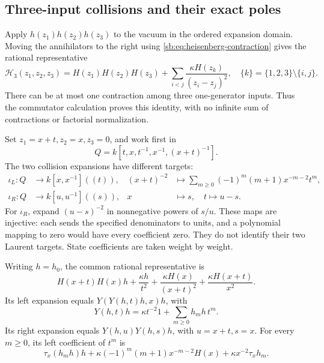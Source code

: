 \subsection{Three-input collisions and their exact poles}

Apply \(h(z_1)h(z_2)h(z_3)\) to the vacuum in the ordered
expansion domain.  Moving the annihilators to the right using
\eqref{sb:eq:heisenberg-contraction} gives the rational representative
\[
 \mathcal H_3(z_1,z_2,z_3)
 =H(z_1)H(z_2)H(z_3)
  +\sum_{i<j}\frac{\kappa H(z_k)}{(z_i-z_j)^2},
 \quad \{k\}=\{1,2,3\}\setminus\{i,j\}.
\]
There can be at most one contraction among three one-generator inputs.
Thus the commutator calculation proves this identity, with no infinite
sum of contractions or factorial normalization.

Set \(z_1=x+t,z_2=x,z_3=0\), and work first in
\[
 Q=k[t,x,t^{-1},x^{-1},(x+t)^{-1}].
\]
The two collision expansions have different targets:
\[
 \begin{aligned}
 \iota_L:Q&\longrightarrow k[x,x^{-1}]((t)),&
 (x+t)^{-2}&\longmapsto\sum_{m\ge0}(-1)^m(m+1)x^{-m-2}t^m,\\
 \iota_R:Q&\longrightarrow k[u,u^{-1}]((s)),&
 x&\longmapsto s,\quad t\longmapsto u-s.
 \end{aligned}
\]
For \(\iota_R\), expand \((u-s)^{-2}\) in nonnegative
powers of \(s/u\).  These maps are injective: each sends the
specified denominators to units, and a polynomial mapping to zero
would have every coefficient zero.  They do not identify their two
Laurent targets.  State coefficients are taken weight by weight.

\begin{proposition}\label{sb:prop:heisenberg-three}
Writing \(h=h_0\), the common rational representative is
\begin{equation}\label{sb:eq:heisenberg-three}
 H(x+t)H(x)h+\frac{\kappa h}{t^2}
       +\frac{\kappa H(x)}{(x+t)^2}
       +\frac{\kappa H(x+t)}{x^2}.
\end{equation}
Its left expansion equals
\(Y(Y(h,t)h,x)h\), with
\[
 Y(h,t)h=\kappa t^{-2}1+\sum_{m\ge0}h_mh\,t^m.
\]
Its right expansion equals \(Y(h,u)Y(h,s)h\), with
\(u=x+t,s=x\).
For every \(m\ge0\), its left coefficient of \(t^m\) is
\begin{equation}\label{sb:eq:heisenberg-coefficient}
 \tau_x(h_mh)h
   +\kappa(-1)^m(m+1)x^{-m-2}H(x)
   +\kappa x^{-2}\tau_xh_m.
\end{equation}
\end{proposition}

